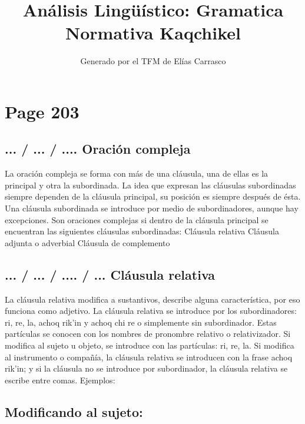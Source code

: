 \documentclass{article}%
\title{Análisis Lingüístico: Gramatica Normativa Kaqchikel}%
\author{Generado por el TFM de Elías Carrasco}%
\begin{document}
%
\normalsize%
\maketitle%
\section{Page 203}%
\label{sec:Page203}%
\subsection{... / ... / .... Oración compleja}%
\label{subsec:.../.../....Oracincompleja}%

%
La oración compleja se forma con más de una cláusula, una de ellas es la principal y %
otra la subordinada. La idea que expresan las cláusulas subordinadas siempre dependen %
de la cláusula principal, su posición es siempre después de ésta. Una cláusula subordinada %
se introduce por medio de subordinadores, aunque hay excepciones. Son oraciones %
complejas si dentro de la cláusula principal se encuentran las siguientes cláusulas %
subordinadas: %
Cláusula relativa %
Cláusula adjunta o adverbial %
Cláusula de complemento %
\subsection{... / ... / .... / ... Cláusula relativa}%
\label{subsec:.../.../..../...Clusularelativa}%

%
La cláusula relativa modifica a sustantivos, describe alguna característica, por eso %
funciona como adjetivo. La cláusula relativa se introduce por los subordinadores: ri, %
re, la, achoq rik'in y achoq chi re o simplemente sin subordinador. Estas partículas se %
conocen con los nombres de pronombre relativo o relativizador. Si modifica al sujeto u %
objeto, se introduce con las partículas: ri, re, la. Si modifica al instrumento o compañía, %
la cláusula relativa se introducen con la frase achoq rik'in; y si la cláusula no se %
introduce por subordinador, la cláusula relativa se escribe entre comas. Ejemplos: %
\subsection{Modificando al sujeto:}%
\label{subsec:Modificandoalsujeto}%
\end{document}
